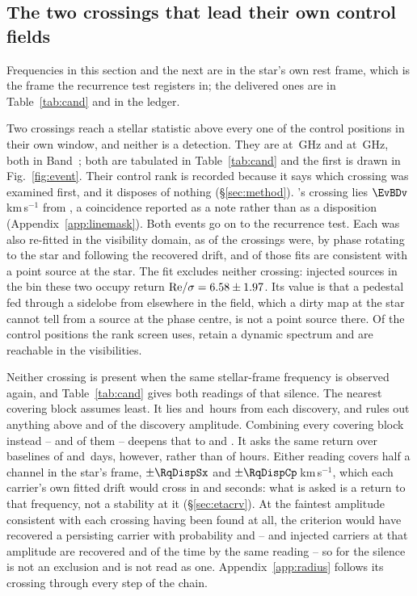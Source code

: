 \subsection{The two crossings that lead their own control fields}
\label{sec:vistest}

Frequencies in this section and the next are in the star's own rest frame,
which is the frame the recurrence test registers in; the delivered ones are in
Table~\ref{tab:cand} and in the ledger.

Two crossings reach a stellar statistic above every one of the \NCtrl{}
control positions in their own window, and neither is a detection. They are
\EvAStar{} at \RqFreqSx\,GHz and \EvBStar{} at \RqFreqCp\,GHz, both in
Band~\EvABand; both are tabulated in Table~\ref{tab:cand} and the first is
drawn in Fig.~\ref{fig:event}. Their control rank is recorded because it says which crossing was examined
first, and it disposes of nothing (\S\ref{sec:method}).
\EvBStar's crossing lies $\EvBDv$\,km\,s$^{-1}$ from \EvBLine, a coincidence
reported as a note rather than as a disposition
(Appendix~\ref{app:linemask}). Both events go on to the recurrence test. Each was also re-fitted in the visibility domain, as \LgNFit{} of the
\NCross{} crossings were, by phase rotating to the star and following the
recovered drift, and \LgNLocalCor{} of those fits are consistent with a point
source at the star. The fit excludes neither crossing: injected sources in
the bin these two occupy return
${\rm Re}/\sigma=6.58\pm1.97$. Its value is that a pedestal fed through a sidelobe from elsewhere in
the field, which a dirty map at the star cannot tell from a source at the
phase centre, is not a point source there. Of the \NCtrl{} control positions
the rank screen uses, \RcNRetCtrl{} retain a dynamic spectrum and
\RcNVisCtrl{} are reachable in the visibilities.

Neither crossing is present when the same stellar-frame frequency is observed
again, and Table~\ref{tab:cand} gives both readings of that silence. The nearest covering block assumes least. It lies \RcSxNearH{} and
\EvBDeepH\,hours from each discovery, and rules out anything above
\RqNearFracSx{} and \RqNearFracCp{} of the discovery amplitude. Combining every covering block instead -- \RqNRepSx{} and \RqNRepCp{} of
them -- deepens that to \RcSxFive{} and \RcCpFive. It asks the same return
over baselines of \RqSpanDSx{} and \RqSpanDCp\,days, however, rather than of
hours. Either
reading covers half a channel in the star's frame, $\pm\RqDispSx$ and
$\pm\RqDispCp$\,km\,s$^{-1}$, which each carrier's own fitted drift would
cross in \ZtSxLeaveSec{} and \ZtCpLeaveSec{} seconds: what is asked is a
return to that frequency, not a stability at it (\S\ref{sec:etacrv}). At the faintest amplitude consistent with each crossing
having been found at all, the criterion would have recovered a persisting
carrier with probability \RqPowerTrigSx{} and \RqPowerTrigCp{} -- and
injected carriers at that amplitude are recovered \RjMeasSx{} and
\RjMeasCp{} of the time by the same reading -- so for
\EvBStar{} the silence is not an exclusion and is not read as one.
Appendix~\ref{app:radius} follows its crossing through every step
of the chain.


